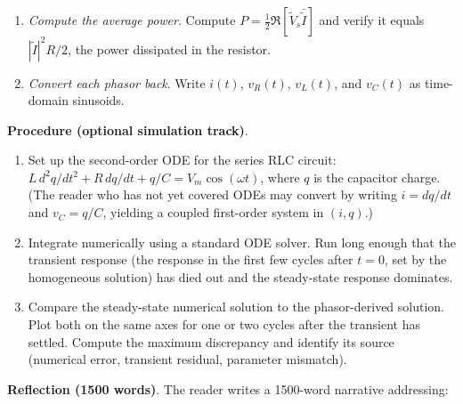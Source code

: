 \begin{project}
\begin{enumerate}[leftmargin=*]
  \item \emph{Compute the average power}. Compute $P =
    \tfrac{1}{2}\Re[\tilde{V}_{s}\bar{\tilde{I}}]$ and verify it
    equals $|\tilde{I}|^{2} R / 2$, the power dissipated in the
    resistor.

  \item \emph{Convert each phasor back}. Write $i(t)$, $v_{R}(t)$,
    $v_{L}(t)$, and $v_{C}(t)$ as time-domain sinusoids.
\end{enumerate}

\textbf{Procedure (optional simulation track)}.

\begin{enumerate}[leftmargin=*]
  \item Set up the second-order ODE for the series RLC circuit:
    $L\,d^{2}q/dt^{2} + R\,dq/dt + q/C = V_{m}\cos(\omega t)$,
    where $q$ is the capacitor charge. (The reader who has not
    yet covered ODEs may convert by writing $i = dq/dt$ and
    $v_{C} = q/C$, yielding a coupled first-order system in
    $(i, q)$.)
  \item Integrate numerically using a standard ODE solver. Run
    long enough that the transient response (the response in
    the first few cycles after $t = 0$, set by the homogeneous
    solution) has died out and the steady-state response
    dominates.
  \item Compare the steady-state numerical solution to the
    phasor-derived solution. Plot both on the same axes for
    one or two cycles after the transient has settled. Compute
    the maximum discrepancy and identify its source (numerical
    error, transient residual, parameter mismatch).
\end{enumerate}

\textbf{Reflection (1500 words)}. The reader writes a 1500-word
narrative addressing:


\end{project}
